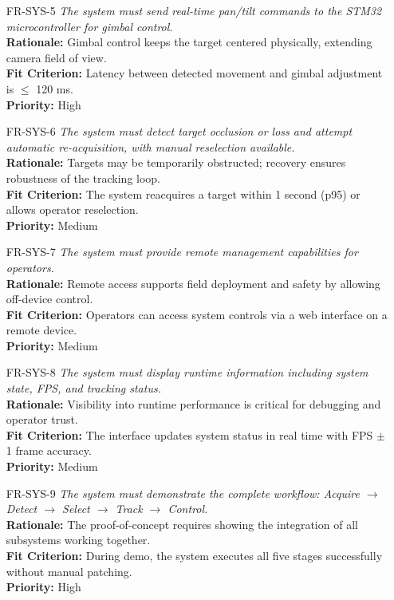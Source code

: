 \documentclass[12pt]{article}
\begin{document}
\begin{itemize}
  \item[FR-SYS-5] \emph{The system must send real-time pan/tilt commands to the STM32 microcontroller for gimbal control.}\\[2mm]
    {\bf Rationale:} Gimbal control keeps the target centered physically, extending camera field of view.\\
    {\bf Fit Criterion:} Latency between detected movement and gimbal adjustment is $\leq$ 120 ms.\\
    {\bf Priority:} High

  \item[FR-SYS-6] \emph{The system must detect target occlusion or loss and attempt automatic re-acquisition, with manual reselection available.}\\[2mm]
    {\bf Rationale:} Targets may be temporarily obstructed; recovery ensures robustness of the tracking loop.\\
    {\bf Fit Criterion:} The system reacquires a target within 1 second (p95) or allows operator reselection.\\
    {\bf Priority:} Medium

  \item[FR-SYS-7] \emph{The system must provide remote management capabilities for operators.}\\[2mm]
    {\bf Rationale:} Remote access supports field deployment and safety by allowing off-device control.\\
    {\bf Fit Criterion:} Operators can access system controls via a web interface on a remote device.\\
    {\bf Priority:} Medium

  \item[FR-SYS-8] \emph{The system must display runtime information including system state, FPS, and tracking status.}\\[2mm]
    {\bf Rationale:} Visibility into runtime performance is critical for debugging and operator trust.\\
    {\bf Fit Criterion:} The interface updates system status in real time with FPS $\pm$ 1 frame accuracy.\\
    {\bf Priority:} Medium

  \item[FR-SYS-9] \emph{The system must demonstrate the complete workflow: Acquire $\rightarrow$ Detect $\rightarrow$ Select $\rightarrow$ Track $\rightarrow$ Control.}\\[2mm]
    {\bf Rationale:} The proof-of-concept requires showing the integration of all subsystems working together.\\
    {\bf Fit Criterion:} During demo, the system executes all five stages successfully without manual patching.\\
    {\bf Priority:} High


\end{itemize}
\end{document}
